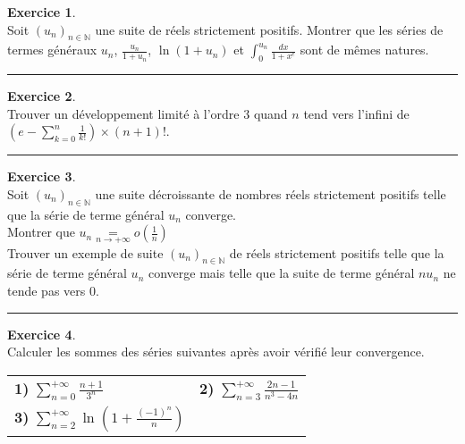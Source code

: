 \documentclass[a4paper,10pt]{article}
\theoremstyle{definition}
\theoremstyle{definition}
\newtheorem{exo}{Exercice}
\newcommand{\N}{\mathbb{N}}
\begin{document}
\begin{minipage}{1\linewidth}
\begin{minipage}[t]{0.48\linewidth}
		
					\begin{exo}\quad\\[0.2cm]
						Soit $(u_n)_{n\in\N}$ une suite de réels strictement positifs. Montrer que les séries de termes généraux $u_n$, $\frac{u_n}{1+u_n}$, $\ln(1+u_n)$ et $\int_{0}^{u_n}\frac{dx}{1+x^e}$  sont de mêmes natures.
			
			\centering
			\rule{1\linewidth}{0.6pt}
		\end{exo}
	
			
	\begin{exo}\quad\\[0.2cm]
		
		Trouver un développement limité à l'ordre $3$ quand $n$ tend vers l'infini de $\left(e-\sum_{k=0}^{n}\frac{1}{k!}\right)\times(n+1)!$.
		
		\centering
		\rule{1\linewidth}{0.6pt}
	\end{exo}
		
	\end{minipage}	
	\hfill\vrule\hfill
	\begin{minipage}[t]{0.48\linewidth}
		\raggedright
		
		
		\begin{exo}\quad\\[0.2cm]
			Soit $(u_n)_{n\in\N}$ une suite décroissante de nombres réels strictement positifs telle que la série de terme général $u_n$ converge.\\[0.2cm] Montrer que $u_n\underset{n\rightarrow+\infty}{=}o\left(\frac{1}{n}\right)$\\[0.2cm]Trouver un exemple de suite $(u_n)_{n\in\N}$ de réels strictement positifs telle que la série de terme général $u_n$ converge mais telle que la suite de terme général $nu_n$ ne tende pas vers $0$.
			
			\centering
			\rule{1\linewidth}{0.6pt}
		\end{exo}	
		
		\begin{exo}\quad\\[0.2cm]
		Calculer les sommes des séries suivantes après avoir vérifié leur convergence.
		\begin{center}
			\begin{tabular}{ll}
				\textbf{1)} $\sum_{n=0}^{+\infty}\frac{n+1}{3^n}$ &\textbf{2)} $\sum_{n=3}^{+\infty}\frac{2n-1}{n^3-4n}$\\[0.3cm] \textbf{3)} $\sum_{n=2}^{+\infty}\ln\left(1+\frac{(-1)^n}{n}\right)$ & \\
				

\end{tabular}
\end{center}
\end{exo}
\end{minipage}
\end{minipage}
\end{document}
